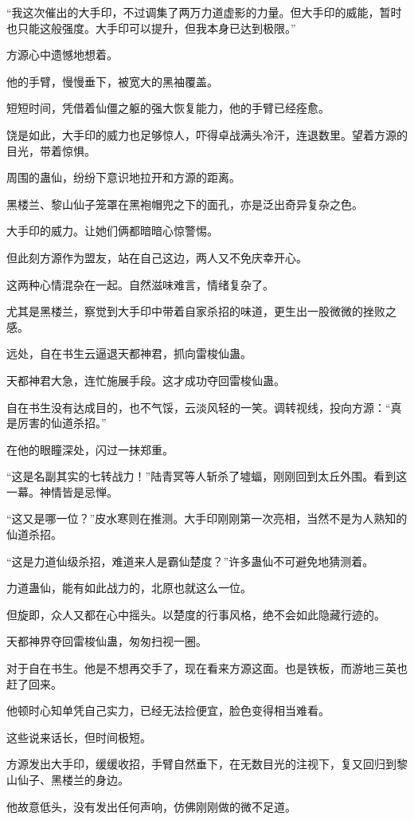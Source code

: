 \begin{this_body}
“我这次催出的大手印，不过调集了两万力道虚影的力量。但大手印的威能，暂时也只能这般强度。大手印可以提升，但我本身已达到极限。”

方源心中遗憾地想着。

他的手臂，慢慢垂下，被宽大的黑袖覆盖。

短短时间，凭借着仙僵之躯的强大恢复能力，他的手臂已经痊愈。

饶是如此，大手印的威力也足够惊人，吓得卓战满头冷汗，连退数里。望着方源的目光，带着惊惧。

周围的蛊仙，纷纷下意识地拉开和方源的距离。

黑楼兰、黎山仙子笼罩在黑袍帽兜之下的面孔，亦是泛出奇异复杂之色。

大手印的威力。让她们俩都暗暗心惊警惕。

但此刻方源作为盟友，站在自己这边，两人又不免庆幸开心。

这两种心情混杂在一起。自然滋味难言，情绪复杂了。

尤其是黑楼兰，察觉到大手印中带着自家杀招的味道，更生出一股微微的挫败之感。

远处，自在书生云逼退天都神君，抓向雷梭仙蛊。

天都神君大急，连忙施展手段。这才成功夺回雷梭仙蛊。

自在书生没有达成目的，也不气馁，云淡风轻的一笑。调转视线，投向方源：“真是厉害的仙道杀招。”

在他的眼瞳深处，闪过一抹郑重。

“这是名副其实的七转战力！”陆青冥等人斩杀了墟蝠，刚刚回到太丘外围。看到这一幕。神情皆是忌惮。

“这又是哪一位？”皮水寒则在推测。大手印刚刚第一次亮相，当然不是为人熟知的仙道杀招。

“这是力道仙级杀招，难道来人是霸仙楚度？”许多蛊仙不可避免地猜测着。

力道蛊仙，能有如此战力的，北原也就这么一位。

但旋即，众人又都在心中摇头。以楚度的行事风格，绝不会如此隐藏行迹的。

天都神界夺回雷梭仙蛊，匆匆扫视一圈。

对于自在书生。他是不想再交手了，现在看来方源这面。也是铁板，而游地三英也赶了回来。

他顿时心知单凭自己实力，已经无法捡便宜，脸色变得相当难看。

这些说来话长，但时间极短。

方源发出大手印，缓缓收招，手臂自然垂下，在无数目光的注视下，复又回归到黎山仙子、黑楼兰的身边。

他故意低头，没有发出任何声响，仿佛刚刚做的微不足道。


\end{this_body}
